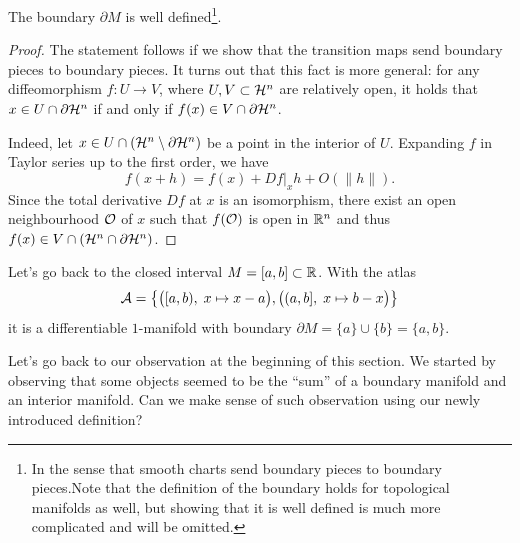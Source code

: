 \begin{proposition}\label{prop:bdwelldef}
  The boundary $\partial M$ is well defined\footnote{In the sense that smooth charts send boundary pieces to boundary pieces.Note that the definition of the boundary holds for topological manifolds as well, but showing that it is well defined is much more complicated and will be omitted.}.
\end{proposition}
\begin{proof}
  The statement follows if we show that the transition maps send boundary pieces to boundary pieces.
  It turns out that this fact is more general: for any diffeomorphism $f:U \to V$, where $U,V \subset\mathcal{H}^n$ are relatively open, it holds that $x\in U\cap\partial\mathcal{H}^n$ if and only if $f(x)\in V\cap\partial\mathcal{H}^n$.

  Indeed, let $x\in U\cap(\mathcal{H}^n\setminus\partial\mathcal{H}^n)$ be a point in the interior of $U$. Expanding $f$ in Taylor series up to the first order, we have
  \begin{equation}
    f(x+h) = f(x) + Df|_x h + O(\|h\|).
  \end{equation}
  Since the total derivative $D f$ at $x$ is an isomorphism, there exist an open neighbourhood $\mathcal{O}$ of $x$ such that $f(\mathcal{O})$ is open in $\mathbb{R}^n$ and thus $f(x)\in V\cap(\mathcal{H}^n\cap\partial\mathcal{H}^n)$.
\end{proof}

\begin{example}
  Let's go back to the closed interval $M=[a,b]\subset\mathbb{R}$. 
  With the atlas
  \begin{equation}
    \mathcal{A}=\big\{
      \big([a,b), \; x\mapsto x-a\big),
      \big((a,b], \; x\mapsto b-x\big)
    \big\}
  \end{equation}
  it is a differentiable $1$-manifold with boundary $\partial M = \{a\} \cup \{b\} = \{a, b\}$.
\end{example}

Let's go back to our observation at the beginning of this section.
We started by observing that some objects seemed to be the ``sum'' of a boundary manifold and an interior manifold.
Can we make sense of such observation using our newly introduced definition?

